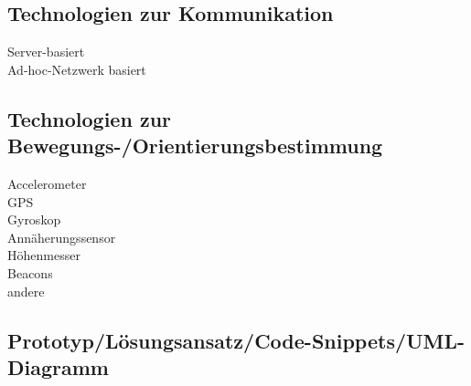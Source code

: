 \technologyObjectDesc

\subsection*{Technologien zur Kommunikation}
\checkbox{\technologyCommunicationServer} Server-basiert \\
\checkbox{\technologyCommunicationAdhoc} Ad-hoc-Netzwerk basiert\\

\technologyCommunicationDesc

\subsection*{Technologien zur Bewegungs-/Orientierungsbestimmung}
\checkbox{\technologyOrientationAccelerometer} Accelerometer \\
\checkbox{\technologyOrientationGPS} GPS \\
\checkbox{\technologyOrientationGyroskop} Gyroskop \\
\checkbox{\technologyOrientationAnnaeherung} Annäherungssensor \\
\checkbox{\technologyOrientationHoehe} Höhenmesser \\
\checkbox{\technologyOrientationBeacons} Beacons \\
\checkbox{\technologyOrientationOther} andere \\

\technologyOrientationDesc 

\subsection*{Prototyp/Lösungsansatz/Code-Snippets/UML-Diagramm}
\prototype

\begin{figure}[H]
\end{figure}

\begin{figure}[H]
\end{figure}

\begin{figure}[H]
\end{figure}

\begin{figure}[H]
\end{figure}

